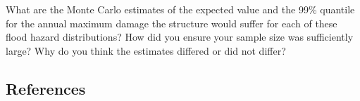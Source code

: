 \documentclass[
  letterpaper,
  DIV=11,
  numbers=noendperiod]{scrartcl}
\begin{document}
What are the Monte Carlo estimates of the expected value and the 99\%
quantile for the annual maximum damage the structure would suffer for
each of these flood hazard distributions? How did you ensure your sample
size was sufficiently large? Why do you think the estimates differed or
did not differ?

\subsection{References}\label{references}
\end{document}

